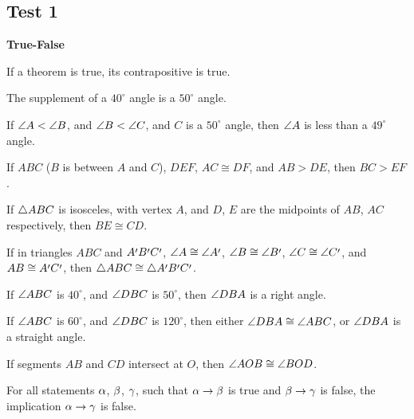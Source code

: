 \documentclass[11pt]{book}
\begin{document}
\subsection*{Test 1}
\begin{center}\bfseries True-False\end{center}
\begin{exlist}
\item If a theorem is true, its contrapositive is true.
\item The supplement of a $40^\circ$ angle is a $50^\circ$ angle.
\item If $\angle A < \angle B$, and $\angle B < \angle C$, and $C$ is a $50^\circ$
  angle, then $\angle A$ is less than a $49^\circ$ angle.
\item If $ABC$ ($B$ is between $A$ and $C$), $DEF$, $AC \cong DF$, and $AB >
  DE$, then $BC > EF$.
\item If $\triangle ABC$ is isosceles, with vertex $A$, and $D$, $E$ are the
  midpoints of $AB$, $AC$ respectively, then $BE \cong CD$.
\item If in triangles $ABC$ and $A\VIpr B\VIpr C\VIpr$, $\ang{A} \cong
  \ang{A\VIpr}$, $\ang{B} \cong \ang{B\VIpr}$, $\ang{C} \cong \ang{C\VIpr}$,
  and $AB \cong A\VIpr C\VIpr$, then $\tri{ABC} \cong \tri{A\VIpr B\VIpr
  C\VIpr}$.
\item If $\angle ABC$ is $40^\circ$, and $\angle DBC$ is $50^\circ$, then
  $\angle DBA$ is a right angle.
\item If $\angle ABC$ is $60^\circ$, and $\angle DBC$ is $120^\circ$, then either
  $\angle DBA \cong \angle ABC$, or $\angle DBA$ is a straight angle.
\item If segments $AB$ and $CD$ intersect at $O$, then $\angle AOB \cong
  \angle BOD$.
\item For all statements $\alpha$, $\beta$, $\gamma$, such that $\alpha \to \beta$ is true
  and $\beta \to \gamma$ is false, the implication $\alpha \to \gamma$ is false.
\end{exlist}
\end{document}
